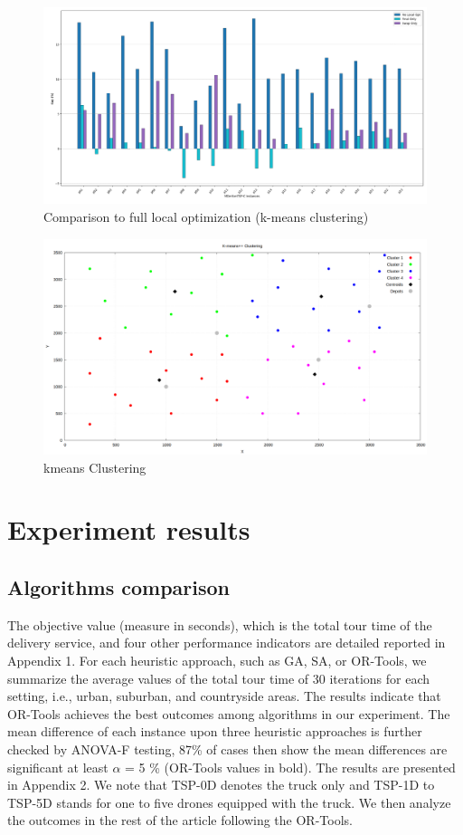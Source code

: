 \documentclass[twocolumn]{article}
\begin{document}
	\begin{figure}[t]
		\caption{Comparison to full local optimization (k-means clustering)}
		\centering
		\includegraphics[width=\textwidth]{local_opt_comp_to_full_kmeans}
	\end{figure}
	\begin{figure}[t]
		\caption[width=\textwidth]{kmeans Clustering}
		\includegraphics[width=\textwidth]{kmeans-01}
		\centering
	\end{figure}
	\twocolumn
	\section{Experiment results}
	\subsection{Algorithms comparison}
	The objective value (measure in seconds), which is the total tour time of the delivery service, and four other performance indicators are detailed reported in Appendix 1. For each heuristic approach, such as GA, SA, or OR-Tools, we summarize the average values of the total tour time of 30 iterations for each setting, i.e., urban, suburban, and countryside areas. The results indicate that OR-Tools achieves the best outcomes among algorithms in our experiment. The mean difference of each instance upon three heuristic approaches is further checked by ANOVA-F testing, 87\% of cases then show the mean differences are
	significant at least $\alpha$ = 5 \% (OR-Tools values in bold). The results are presented in Appendix 2. We note that TSP-0D denotes the truck only and TSP-1D to TSP-5D stands for one to five drones equipped with the truck. We then analyze the outcomes in the rest of the article following the OR-Tools.
	
\end{document}
